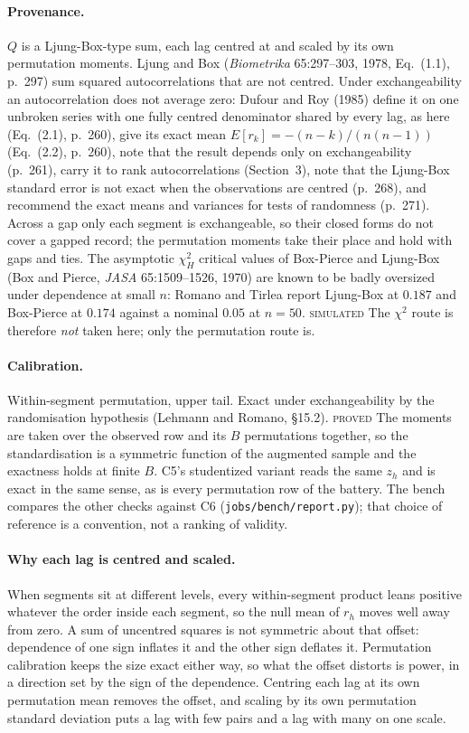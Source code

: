 \documentclass[11pt,a4paper]{article}
\newcommand{\PROVED}{\textsc{\textcolor{blue!55!black}{proved}}}
\newcommand{\SIMULATED}{\textsc{\textcolor{orange!70!black}{simulated}}}
\begin{document}
\paragraph{Provenance.} $Q$ is a Ljung-Box-type sum, each lag centred at and scaled by its
own permutation moments. Ljung and Box (\emph{Biometrika} 65:297--303, 1978, Eq.~(1.1),
p.~297) sum squared autocorrelations that are not centred. Under exchangeability an
autocorrelation does not average zero: Dufour and Roy (1985) define it on one unbroken
series with one fully centred denominator shared by every lag, as here (Eq.~(2.1),
p.~260), give its exact mean $E[r_k] = -(n-k)/(n(n-1))$ (Eq.~(2.2), p.~260), note that the
result depends only on exchangeability (p.~261), carry it to rank autocorrelations
(Section~3), note that the Ljung-Box standard error is not exact when the observations are
centred (p.~268), and recommend the exact means and variances for tests of randomness
(p.~271). Across a gap only each segment is exchangeable, so their closed forms do not
cover a gapped record; the permutation moments take their place and hold with gaps and
ties. The asymptotic $\chi^2_H$ critical values of Box-Pierce and Ljung-Box (Box and
Pierce, \emph{JASA} 65:1509--1526, 1970) are known to be badly oversized under dependence
at small $n$: Romano and Tirlea report Ljung-Box at $0.187$ and Box-Pierce at $0.174$
against a nominal $0.05$ at $n=50$. \SIMULATED{} The $\chi^2$ route is therefore
\emph{not} taken here; only the permutation route is.

\paragraph{Calibration.} Within-segment permutation, upper tail. Exact under
exchangeability by the randomisation hypothesis (Lehmann and Romano, \S 15.2). \PROVED{}
The moments are taken over the observed row and its $B$ permutations together, so the
standardisation is a symmetric function of the augmented sample and the exactness holds
at finite $B$. C5's studentized variant reads the same $z_h$ and is exact in the same
sense, as is every
permutation row of the battery. The bench compares the other checks against C6
(\texttt{jobs/bench/report.py}); that choice of reference is a convention, not a ranking
of validity.

\paragraph{Why each lag is centred and scaled.} When segments sit at different levels,
every within-segment product leans positive whatever the order inside each segment, so
the null mean of $r_h$ moves well away from zero. A sum of uncentred squares is not
symmetric about that offset: dependence of one sign inflates it and the other sign
deflates it. Permutation calibration keeps the size exact either way, so what the offset
distorts is power, in a direction set by the sign of the dependence. Centring each lag at
its own permutation mean removes the offset, and scaling by its own permutation standard
deviation puts a lag with few pairs and a lag with many on one scale.
\end{document}
